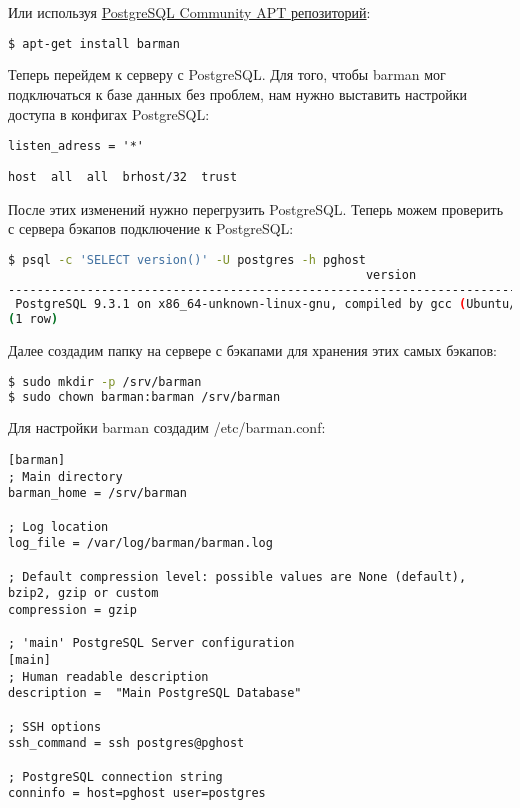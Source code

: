 Или используя \href{https://wiki.postgresql.org/wiki/Apt}{PostgreSQL Community APT репозиторий}:

\begin{lstlisting}[language=Bash,label=lst:barman-apt1,caption=Установка barman]
$ apt-get install barman
\end{lstlisting}

Теперь перейдем к серверу с PostgreSQL. Для того, чтобы barman мог подключаться к базе данных без проблем, нам нужно выставить настройки доступа в конфигах PostgreSQL:

\begin{lstlisting}[label=lst:barman4,caption=Отредактировать в postgresql.conf]
listen_adress = '*'
\end{lstlisting}

\begin{lstlisting}[label=lst:barman5,caption=Добавить в pg\_hba.conf]
host  all  all  brhost/32  trust
\end{lstlisting}

После этих изменений нужно перегрузить PostgreSQL. Теперь можем проверить с сервера бэкапов подключение к PostgreSQL:

\begin{lstlisting}[language=Bash,label=lst:barman6,caption=Проверка подключения к базе]
$ psql -c 'SELECT version()' -U postgres -h pghost
                                                  version
------------------------------------------------------------------------------------------------------------
 PostgreSQL 9.3.1 on x86_64-unknown-linux-gnu, compiled by gcc (Ubuntu/Linaro 4.7.2-2ubuntu1) 4.7.2, 64-bit
(1 row)
\end{lstlisting}

Далее создадим папку на сервере с бэкапами для хранения этих самых бэкапов:

\begin{lstlisting}[language=Bash,label=lst:barman7,caption=Папка для хранения бэкапов]
$ sudo mkdir -p /srv/barman
$ sudo chown barman:barman /srv/barman
\end{lstlisting}

Для настройки barman создадим /etc/barman.conf:

\begin{lstlisting}[label=lst:barman8,caption=barman.conf]
[barman]
; Main directory
barman_home = /srv/barman

; Log location
log_file = /var/log/barman/barman.log

; Default compression level: possible values are None (default), bzip2, gzip or custom
compression = gzip

; 'main' PostgreSQL Server configuration
[main]
; Human readable description
description =  "Main PostgreSQL Database"

; SSH options
ssh_command = ssh postgres@pghost

; PostgreSQL connection string
conninfo = host=pghost user=postgres
\end{lstlisting}


